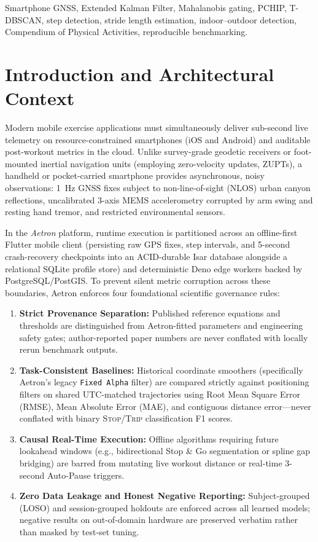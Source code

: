 \documentclass[journal]{IEEEtran}
\begin{document}
\begin{IEEEkeywords}
Smartphone GNSS, Extended Kalman Filter, Mahalanobis gating, PCHIP, T-DBSCAN, step detection, stride length estimation, indoor--outdoor detection, Compendium of Physical Activities, reproducible benchmarking.
\end{IEEEkeywords}

\section{Introduction and Architectural Context}

Modern mobile exercise applications must simultaneously deliver sub-second live telemetry on resource-constrained smartphones (iOS and Android) and auditable post-workout metrics in the cloud. Unlike survey-grade geodetic receivers or foot-mounted inertial navigation units (employing zero-velocity updates, ZUPTs), a handheld or pocket-carried smartphone provides asynchronous, noisy observations: 1~Hz GNSS fixes subject to non-line-of-sight (NLOS) urban canyon reflections, uncalibrated 3-axis MEMS accelerometry corrupted by arm swing and resting hand tremor, and restricted environmental sensors.

In the \emph{Aetron} platform, runtime execution is partitioned across an offline-first Flutter mobile client (persisting raw GPS fixes, step intervals, and 5-second crash-recovery checkpoints into an ACID-durable Isar database alongside a relational SQLite profile store) and deterministic Deno edge workers backed by PostgreSQL/PostGIS. To prevent silent metric corruption across these boundaries, Aetron enforces four foundational scientific governance rules:
\begin{enumerate}
  \item \textbf{Strict Provenance Separation:} Published reference equations and thresholds are distinguished from Aetron-fitted parameters and engineering safety gates; author-reported paper numbers are never conflated with locally rerun benchmark outputs.
  \item \textbf{Task-Consistent Baselines:} Historical coordinate smoothers (specifically Aetron's legacy \texttt{Fixed Alpha} filter) are compared strictly against positioning filters on shared UTC-matched trajectories using Root Mean Square Error (RMSE), Mean Absolute Error (MAE), and contiguous distance error---never conflated with binary \textsc{Stop}/\textsc{Trip} classification F1 scores.
  \item \textbf{Causal Real-Time Execution:} Offline algorithms requiring future lookahead windows (e.g., bidirectional Stop \& Go segmentation or spline gap bridging) are barred from mutating live workout distance or real-time 3-second Auto-Pause triggers.
  \item \textbf{Zero Data Leakage and Honest Negative Reporting:} Subject-grouped (LOSO) and session-grouped holdouts are enforced across all learned models; negative results on out-of-domain hardware are preserved verbatim rather than masked by test-set tuning.
\end{enumerate}
\end{document}
